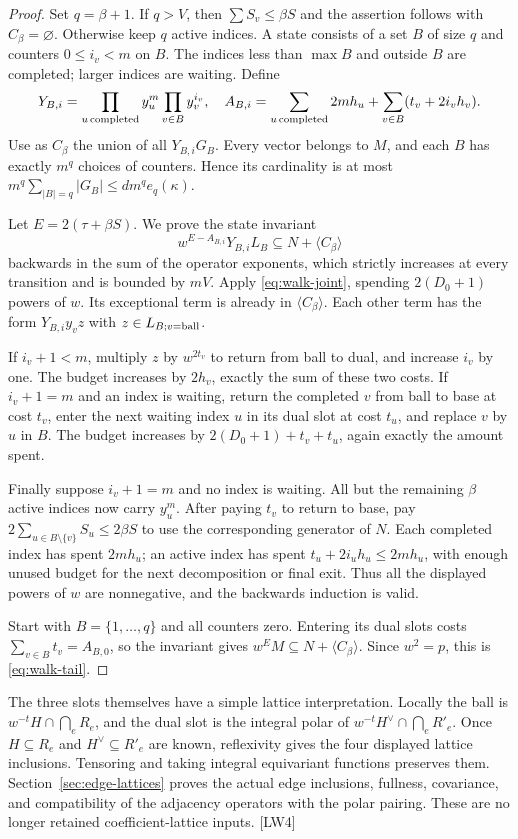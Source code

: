\documentclass[11pt,a4paper]{article}
\numberwithin{equation}{section}
\theoremstyle{remark}\newtheorem{remark}[theorem]{Remark}
\begin{document}
\begin{proof}
Set $q=\beta+1$. If $q>V$, then $\sum S_v\le\beta S$ and the assertion follows with $C_\beta=\varnothing$. Otherwise keep $q$ active indices. A state consists of a set $B$ of size $q$ and counters $0\le i_v<m$ on $B$. The indices less than $\max B$ and outside $B$ are completed; larger indices are waiting. Define
\[
 Y_{B,i}=\prod_{u\,\rm completed}y_u^m\prod_{v\in B}y_v^{i_v},
 \quad
 A_{B,i}=\sum_{u\,\rm completed}2mh_u+
                 \sum_{v\in B}(t_v+2i_vh_v).
\]
Use as $C_\beta$ the union of all $Y_{B,i}G_B$. Every vector belongs to $M$, and each $B$ has exactly $m^q$ choices of counters. Hence its cardinality is at most
$m^q\sum_{|B|=q}|G_B|\le d m^q e_q(\kappa)$.

Let $E=2(\tau+\beta S)$. We prove the state invariant
\[
 w^{E-A_{B,i}}Y_{B,i}L_B\subseteq N+\langle C_\beta\rangle
\]
backwards in the sum of the operator exponents, which strictly increases at every transition and is bounded by $mV$. Apply \eqref{eq:walk-joint}, spending $2(D_0+1)$ powers of $w$. Its exceptional term is already in $\langle C_\beta\rangle$. Each other term has the form $Y_{B,i}y_vz$ with $z\in L_{B;v=\rm ball}$.

If $i_v+1<m$, multiply $z$ by $w^{2t_v}$ to return from ball to dual, and increase $i_v$ by one. The budget increases by $2h_v$, exactly the sum of these two costs. If $i_v+1=m$ and an index is waiting, return the completed $v$ from ball to base at cost $t_v$, enter the next waiting index $u$ in its dual slot at cost $t_u$, and replace $v$ by $u$ in $B$. The budget increases by
$2(D_0+1)+t_v+t_u$, again exactly the amount spent.

Finally suppose $i_v+1=m$ and no index is waiting. All but the remaining $\beta$ active indices now carry $y_u^m$. After paying $t_v$ to return to base, pay
$2\sum_{u\in B\setminus\{v\}}S_u\le2\beta S$ to use the corresponding generator of $N$. Each completed index has spent $2mh_u$; an active index has spent $t_u+2i_uh_u\le2mh_u$, with enough unused budget for the next decomposition or final exit. Thus all the displayed powers of $w$ are nonnegative, and the backwards induction is valid.

Start with $B=\{1,\ldots,q\}$ and all counters zero. Entering its dual slots costs $\sum_{v\in B}t_v=A_{B,0}$, so the invariant gives $w^EM\subseteq N+\langle C_\beta\rangle$. Since $w^2=p$, this is \eqref{eq:walk-tail}.
\end{proof}

The three slots themselves have a simple lattice interpretation. Locally the ball is
$w^{-t}H\cap\bigcap_eR_e$, and the dual slot is the integral polar of
$w^{-t}H^\vee\cap\bigcap_eR'_e$. Once $H\subseteq R_e$ and $H^\vee\subseteq R'_e$ are known, reflexivity gives the four displayed lattice inclusions. Tensoring and taking integral equivariant functions preserves them. Section~\ref{sec:edge-lattices} proves the actual edge inclusions, fullness, covariance, and compatibility of the adjacency operators with the polar pairing. These are no longer retained coefficient-lattice inputs. \textsf{[LW4]}
\end{document}
